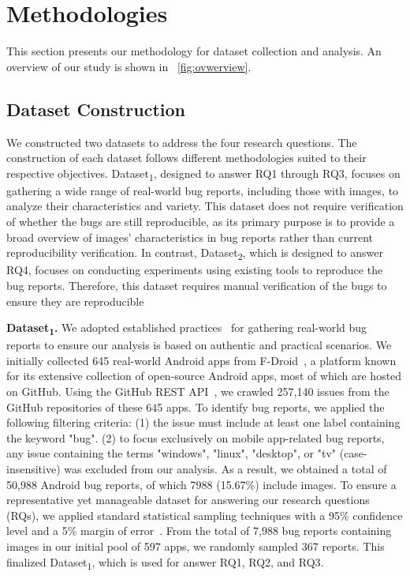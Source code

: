 
\section{Methodologies}

This section presents our methodology for dataset collection and analysis. An overview of our study is shown in ~\ref{fig:ovwerview}.

\subsection{Dataset Construction} 
\label{dataconstruction}
We constructed two datasets to address the four research questions. 
%
The construction of each dataset follows different methodologies suited to their respective objectives. Dataset\textsubscript{1}, designed to answer RQ1 through RQ3, focuses on gathering a wide range of real-world bug reports, including those with images, to analyze their characteristics and variety. This dataset does not require verification of whether the bugs are still reproducible, as its primary purpose is to provide a broad overview of images' characteristics in bug reports rather than current reproducibility verification.
%
In contrast, Dataset\textsubscript{2}, which is designed to answer RQ4, focuses on conducting experiments using existing tools to reproduce the bug reports. Therefore, this dataset requires manual verification of the bugs to ensure they are reproducible%

\noindent
\textbf{Dataset\textsubscript{1}.}
We adopted established practices~\cite{xiong2023empirical, wendland2021andror2, johnson2022empirical, wang2023empirical} for gathering real-world bug reports to ensure our analysis is based on authentic and practical scenarios.
%
We initially collected 645 real-world Android apps from F-Droid~\cite{fdroid}, a platform known for its extensive collection of open-source Android apps, most of which are hosted on GitHub.
%
Using the GitHub REST API~\cite{githubapi}, we crawled 257,140 issues from the GitHub repositories of these 645 apps. To identify bug reports, we applied the following filtering criteria: (1) the issue must include at least one label containing the keyword "bug". (2) to focus exclusively on mobile app-related bug reports, any issue containing the terms "windows", "linux", "desktop", or "tv" (case-insensitive) was excluded from our analysis.
%
As a result, we obtained a total of 50,988 Android bug reports, of which 7988 (15.67\%) include images. 
%
To ensure a representative yet manageable dataset for answering our research questions (RQs), we applied standard statistical sampling techniques with a 95\% confidence level and a 5\% margin of error~\cite{illowsky2013introductory}. From the total of 7,988 bug reports containing images in our initial pool of 597 apps, we randomly sampled 367 reports. This finalized Dataset\textsubscript{1}, which is used for answer RQ1, RQ2, and RQ3. 

